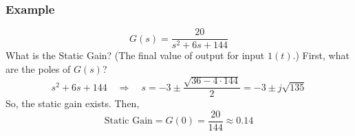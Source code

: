 \documentclass{book}
\newcommand{\exmp}{\subsubsection*{Example}}
\begin{document}
\exmp
\[ G(s) = \frac{20}{s^2+6s+144} \]
What is the Static Gain? (The final value of output for input $ 1(t) $.) First, what are the poles of $ G(s) $?
\[ s^2+6s+144 \quad\Rightarrow\quad s = -3 \pm \frac{\sqrt{36-4\cdot144}}{2} = -3\pm j\sqrt{135}  \]
So, the static gain exists. Then,
\[ \text{Static Gain} = G(0) = \frac{20}{144} \approx 0.14 \]
\end{document}
